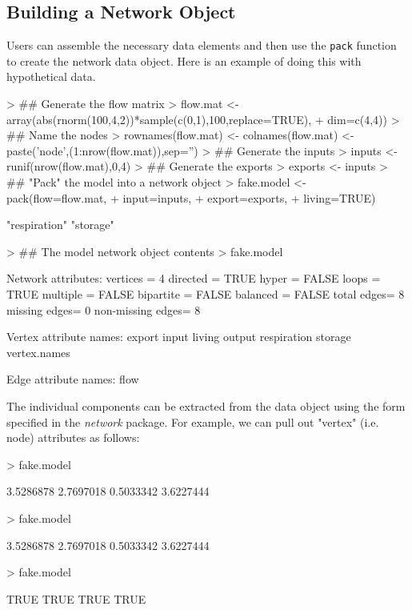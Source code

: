 \documentclass[article]{jss}
\begin{document}
\subsection{Building a Network Object}

Users can assemble the necessary data elements and then use the
\texttt{pack} function to create the network data object.  Here is an
example of doing this with hypothetical data.

\begin{Schunk}
\begin{Sinput}
> ## Generate the flow matrix
> flow.mat <- array(abs(rnorm(100,4,2))*sample(c(0,1),100,replace=TRUE),
+                    dim=c(4,4))
> ## Name the nodes
> rownames(flow.mat) <- colnames(flow.mat) <- paste('node',(1:nrow(flow.mat)),sep='')
> ## Generate the inputs
> inputs <- runif(nrow(flow.mat),0,4)
> ## Generate the exports
> exports <- inputs
> ## "Pack" the model into a network object
> fake.model <- pack(flow=flow.mat,
+                     input=inputs,
+                     export=exports,
+                     living=TRUE)
\end{Sinput}
\begin{Soutput}
[1] "respiration" "storage"    
\end{Soutput}
\begin{Sinput}
> ## The model network object contents
> fake.model
\end{Sinput}
\begin{Soutput}
 Network attributes:
  vertices = 4 
  directed = TRUE 
  hyper = FALSE 
  loops = TRUE 
  multiple = FALSE 
  bipartite = FALSE 
  balanced = FALSE 
  total edges= 8 
    missing edges= 0 
    non-missing edges= 8 

 Vertex attribute names: 
    export input living output respiration storage vertex.names 

 Edge attribute names: 
    flow 
\end{Soutput}
\end{Schunk}

The individual components can be extracted from the data object using
the form specified in the \textit{network} package.  For example, we
can pull out "vertex" (i.e. node) attributes as follows:

\begin{Schunk}
\begin{Sinput}
> fake.model%
\end{Sinput}
\begin{Soutput}
[1] 3.5286878 2.7697018 0.5033342 3.6227444
\end{Soutput}
\begin{Sinput}
> fake.model%
\end{Sinput}
\begin{Soutput}
[1] 3.5286878 2.7697018 0.5033342 3.6227444
\end{Soutput}
\begin{Sinput}
> fake.model%
\end{Sinput}
\begin{Soutput}
[1] TRUE TRUE TRUE TRUE
\end{Soutput}
\end{Schunk}
\end{document}

